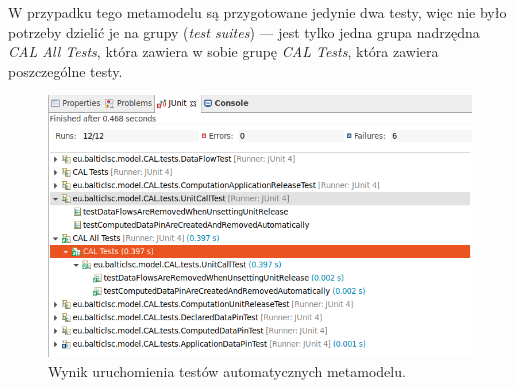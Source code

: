 W przypadku tego metamodelu są przygotowane
jedynie dwa testy, więc nie było potrzeby dzielić je na grupy
(\emph{test suites}) --- jest tylko
jedna grupa nadrzędna \emph{CAL All Tests}, która
zawiera w sobie grupę
\emph{CAL Tests}, która zawiera poszczególne testy.

\begin{figure}[!hb]
	\centering

	\includegraphics[width=0.95\linewidth]{./images/sirius-desktop-metamodel-tests.png}
	\caption{Wynik uruchomienia testów automatycznych
  metamodelu.}\label{rys:sirius-desktop-metamodel-tests}
\end{figure}

